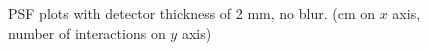 \documentclass[a4paper]{article}
\begin{document}
\begin{figure}[H]
  \caption{PSF plots with detector thickness of 2 mm, no blur. (cm on $x$ axis, number of interactions on $y$ axis)}
  \label{fig:020_xs}
\end{figure}
\end{document}
